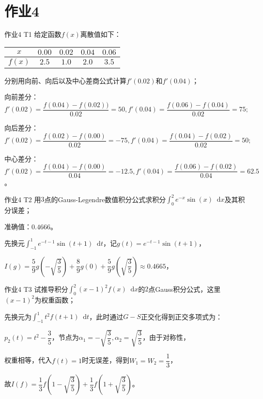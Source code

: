 \documentclass[10pt]{beamer}
\newcommand*{\diff}{\mathop{}\!\mathrm{d}}
\begin{document}
\section{作业4}
    \begin{frame}{作业4 T1}
        给定函数$f(x)$离散值如下：
        \begin{table}[H]
            \begin{center}
                \begin{tabular}{|c|c|c|c|c|}
                \hline
                $x$ & $0.00$ & $0.02$ & $0.04$ & $0.06$ \\
                \hline
                $f(x)$ & $2.5$ & $1.0$ & $2.0$ & $3.5$ \\
                \hline
                \end{tabular}
            \end{center}
        \end{table}
        分别用向前、向后以及中心差商公式计算$f'(0.02)$和$f'(0.04)$；\vspace{1cm}

        \pause 向前差分：$f'(0.02)=\dfrac{f(0.04)-f(0.02))}{0.02}=50,f'(0.04)=\dfrac{f(0.06)-f(0.04)}{0.02}=75;$

        \pause 向后差分：$f'(0.02)=\dfrac{f(0.02)-f(0.00)}{0.02}=-75,f'(0.04)=\dfrac{f(0.04)-f(0.02)}{0.02}=50;$

        \pause 中心差分：$f'(0.02)=\dfrac{f(0.04)-f(0.00)}{0.04}=-12.5,f'(0.04)=\dfrac{f(0.06)-f(0.02)}{0.04}=62.5$。
    \end{frame}
    \begin{frame}{作业4 T2}
        用$3$点的Gauss-Legendre数值积分公式求积分$\int_0^2 e^{-x}\sin(x)\diff x$及其积分误差；\vspace{1cm}

        \pause 准确值：$0.4666$。

        \pause 先换元$\int_{-1}^1 e^{-t-1}\sin(t+1)\diff t$，记$g(t)=e^{-t-1}\sin(t+1)$，

        \pause $I(g)=\dfrac59 g\left(-\sqrt{\dfrac35}\right)+\dfrac89 g(0)+\dfrac59 g\left(\sqrt{\dfrac35}\right)\approx0.4665$，
    \end{frame}
    \begin{frame}{作业4 T3}
        试推导积分$\int_0^2 (x-1)^2 f(x)\diff x$的$2$点Gauss积分公式，这里$(x-1)^2$为权重函数；\vspace{1cm}

        \pause 先换元为$\int_{-1}^1 t^2 f(t+1)\diff t$，此时通过$G-S$正交化得到正交多项式为：

        \pause $p_2(t)=t^2-\dfrac35$，节点为$\alpha_1=-\sqrt{\dfrac35},\alpha_2=\sqrt{\dfrac35}$，由于对称性，

        \pause 权重相等，代入$f(t)=1$时无误差，得到$W_1=W_2=\dfrac13$，

        \pause 故$I(f)=\dfrac13 f\left(1-\sqrt{\dfrac35}\right)+\dfrac13f\left(1+\sqrt{\dfrac35}\right)$。
    \end{frame}
\end{document}
